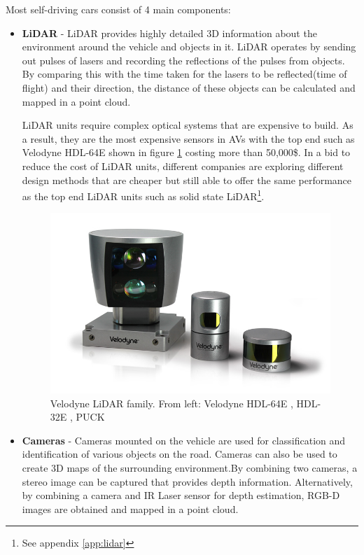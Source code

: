 Most self-driving cars consist of 4 main components: 
\begin{itemize}
	\item \textbf{LiDAR} - LiDAR provides highly detailed 3D information about the environment around the vehicle and objects in it. LiDAR operates by sending out pulses of lasers and recording the reflections of the pulses from objects. By comparing this with the time taken for the lasers to be reflected(time of flight) and their direction, the distance of these objects can be calculated and mapped in a point cloud. 

	LiDAR units require complex optical systems that are expensive to build. As a result,  they are the most expensive sensors in AVs with the top end such as Velodyne HDL-64E shown in figure \ref{fig:lidar} costing more than 50,000\$. 
	In a bid to reduce the cost of LiDAR units,  different companies are exploring different design methods that are cheaper but still able to offer the same performance as the top end LiDAR units such as solid state LiDAR\footnote{See appendix \ref{app:lidar}}.
	
	 \begin{figure}[h]
	 	\centering
	 	\includegraphics[width=\textwidth]{media/hdl-family.png}
	 	\caption{Velodyne LiDAR family. From left: Velodyne HDL-64E , HDL-32E , PUCK}
	 	\label{fig:lidar}
	 \end{figure}
	
	\item \textbf{Cameras} - Cameras mounted on the vehicle are used for classification and identification of various objects on the road. 
	Cameras can also be used to create 3D maps of the surrounding environment.By combining two cameras, a stereo image can be captured that provides depth information. Alternatively, by combining a camera and IR Laser sensor for depth estimation, RGB-D \cite{henry2010rgb} images are obtained and mapped in a point cloud.
	

\end{itemize}
